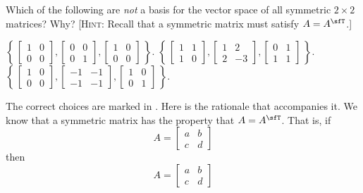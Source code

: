 \begin{questions}
  \question Which of the following are \emph{not} a basis for the vector
  space of all symmetric $2\times 2$ matrices? Why? [\textsc{Hint}: Recall
  that a symmetric matrix must satisfy $A=A^\sfT$.]
  \begin{choices}
    \choice%
    $\displaystyle\left\{\,%
      \begin{bmatrix}1&0\\0&0\end{bmatrix},%
      \begin{bmatrix}0&0\\0&1\end{bmatrix},
      \begin{bmatrix}1&0\\0&0\end{bmatrix}%
      \,\right\}$.%
    \CorrectChoice%
    $\displaystyle\left\{\,%
      \begin{bmatrix}1&1\\1&0\end{bmatrix},
      \begin{bmatrix}1&2\\2&-3\end{bmatrix},
      \begin{bmatrix}0&1\\1&1\end{bmatrix}%
      \,\right\}$.%
    \CorrectChoice%
    $\displaystyle\left\{\,
      \begin{bmatrix}1&0\\0&0\end{bmatrix},
      \begin{bmatrix}-1&-1\\-1&-1\end{bmatrix},%
      \begin{bmatrix}1&0\\0&1\end{bmatrix}%
      \,\right\}$.%
  \end{choices}
  \begin{solution}
    The correct choices are marked in . Here is the
    rationale that accompanies it. We know that a symmetric matrix has the
    property that $A=A^\sfT$. That is, if
    \[
      A=\begin{bmatrix} a&b\\c&d
      \end{bmatrix}
    \]
    then
    \[
      A=
      \begin{bmatrix}
        a&b\\c&d

\end{bmatrix}\]
\end{solution}
\end{questions}

